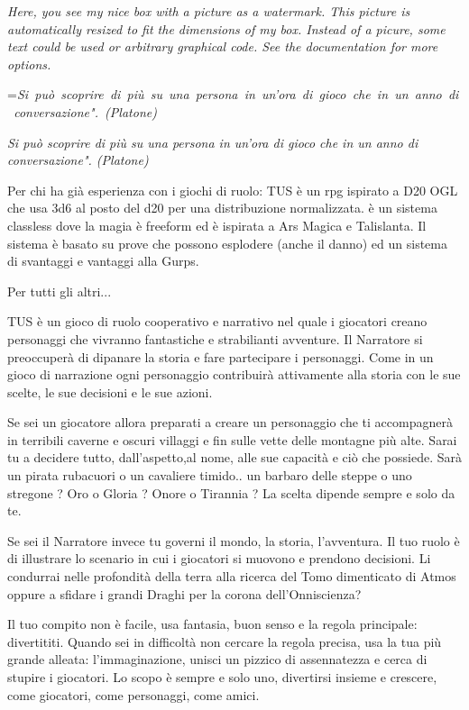\documentclass[a4paper,11pt,twoside,openany]{book}
\makeatletter
\newcommand{\mybox}[1]{%
	\setbox0=\hbox{#1}%
	\setlength{\@tempdima}{\dimexpr\wd0+13pt}%
	\begin{tcolorbox}[boxrule=0.5pt,arc=4pt, breakable,enhanced,
		left=6pt,right=6pt,top=6pt,bottom=6pt,boxsep=0pt,width=\@tempdima]
		#1
	\end{tcolorbox}
}
\makeatother
\begin{document}
\begin{tcolorbox}[enhanced,arc=5pt,boxrule=0.3pt]\textit{
	Here, you see my nice box with a picture as a watermark.
	This picture is automatically resized to fit the dimensions
	of my box. Instead of a picure, some text could be used or
	arbitrary graphical code. See the documentation for more options.}
\end{tcolorbox}

\mybox{\textit{Si può scoprire di più su una persona in un'ora di gioco che in un anno di conversazione". (Platone)}}\medskip

Per chi ha già esperienza con i giochi di ruolo: TUS è un rpg ispirato a D20 OGL che usa 3d6 al posto del d20 per una distribuzione normalizzata. è un sistema classless dove la magia è freeform ed è ispirata a Ars Magica e Talislanta. Il sistema è basato su prove che possono esplodere (anche il danno) ed un sistema di svantaggi e vantaggi alla Gurps. 

Per tutti gli altri...

TUS è un gioco di ruolo cooperativo e narrativo nel quale i giocatori creano personaggi che vivranno fantastiche e strabilianti avventure. Il Narratore si preoccuperà di dipanare la storia e fare partecipare i personaggi. Come in un gioco di narrazione ogni personaggio contribuirà attivamente alla storia con le sue scelte, le sue decisioni e le sue azioni.

Se sei un giocatore allora preparati a creare un personaggio che ti accompagnerà in terribili caverne e oscuri villaggi e fin sulle vette delle montagne più alte. Sarai tu a decidere tutto, dall'aspetto,al nome, alle sue capacità e ciò che possiede. Sarà un pirata rubacuori o un cavaliere timido.. un barbaro delle steppe o uno stregone ? Oro o Gloria ? Onore o Tirannia ? La scelta dipende sempre e solo da te.

Se sei il Narratore invece tu governi il mondo, la storia, l'avventura. Il tuo ruolo è di illustrare lo scenario in cui i giocatori si muovono e prendono decisioni. Li condurrai nelle profondità della terra alla ricerca del Tomo dimenticato di Atmos oppure a sfidare i grandi Draghi per la corona dell'Onniscienza?

Il tuo compito non è facile, usa fantasia, buon senso e la regola principale: divertititi. Quando sei in difficoltà non cercare la regola precisa, usa la tua più grande alleata: l'immaginazione, unisci un pizzico di assennatezza e cerca di stupire i giocatori. Lo scopo è sempre e solo uno, divertirsi insieme e crescere, come giocatori, come personaggi, come amici.
\end{document}
